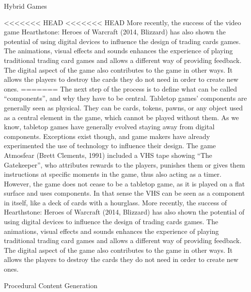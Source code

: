 Hybrid Games

<<<<<<< HEAD
<<<<<<< HEAD
More recently, the success of the video game Hearthstone: Heroes of Warcraft (2014, Blizzard) has also shown the potential of using digital devices to influence the design of trading cards games. The animations, visual effects and sounds enhances the experience of playing traditional trading card games and allows a different way of providing feedback. The digital aspect of the game also contributes to the game in other ways. It allows the players to destroy the cards they do not need in order to create new ones.
=======
The next step of the process is to define what can be called “components”, and why they have to be central. Tabletop games’ components are generally seen as physical. They can be cards, tokens, pawns, or any object used as a central element in the game, which cannot be played without them.  As we know, tabletop games have generally evolved staying away from digital components. Exceptions exist though, and game makers have already experimented the use of technology to influence their design. The game Atmosfear (Brett Clements, 1991) included a VHS tape showing “The Gatekeeper”, who attributes rewards to the players, punishes them or gives them instructions at specific moments in the game, thus also acting as a timer. However, the game does not cease to be a tabletop game, as it is played on a flat surface and uses components. In that sense the VHS can be seen as a component in itself, like a deck of cards with a hourglass. 
More recently, the success of Hearthstone: Heroes of Warcraft (2014, Blizzard) has also shown the potential of using digital devices to influence the design of trading cards games. The animations, visual effects and sounds enhances the experience of playing traditional trading card games and allows a different way of providing feedback. The digital aspect of the game also contributes to the game in other ways. It allows the players to destroy the cards they do not need in order to create new ones.




Procedural Content Generation

